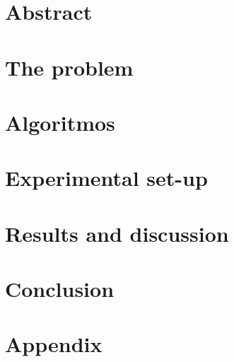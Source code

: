 \documentclass[a4paper,10pt,twoside]{report}
\author{\me}
\begin{document}


\normalsize

\chapter*{Abstract}\label{chapter:Abstract}
\setcounter{page}{0}


\tableofcontents

\chapter{The problem}\label{chapter:Introduction}
\setcounter{page}{0}


\chapter{Algoritmos}\label{chapter:Algorithms}


\chapter{Experimental set-up}\label{chapter:Experimental set-up}


\chapter{Results and discussion}\label{chapter:Results and discussion}


\chapter{Conclusion}\label{chapter:Conclusion}




\newpage

\appendix
{}
\chapter{Appendix}\label{chapter:Appendix A}

\end{document}

